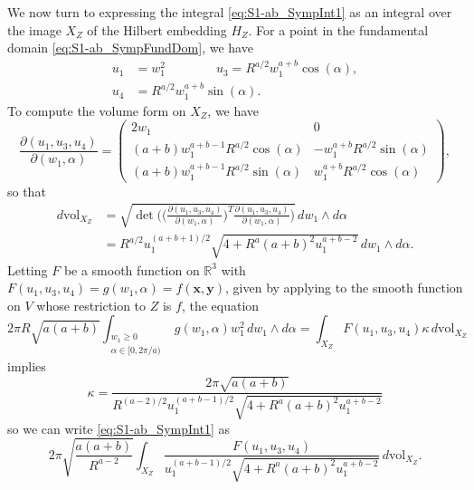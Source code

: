 \documentclass[twoside]{amsart}
\theoremstyle{definition}
\theoremstyle{remark}
\numberwithin{equation}{section}
\newcommand{\R}{\mathbb{R}}
\newcommand{\vol}{\text{vol}}
\begin{document}
We now turn to expressing the integral \eqref{eq:S1-ab_SympInt1} as an integral over the image $X_Z$ of the Hilbert embedding $H_Z$.
For a point in the fundamental domain \eqref{eq:S1-ab_SympFundDom}, we have
\begin{equation}
\label{eq:S1-ab_SympRInvarsInW}
\begin{split}
    u_1 &=      w_1^2
    \qquad\qquad
    u_3 =       R^{a/2} w_1^{a + b} \cos(\alpha),
    \\
    u_4 &=      R^{a/2} w_1^{a + b} \sin(\alpha).
\end{split}
\end{equation}
To compute the volume form on $X_Z$, we have
\[
    \frac{\partial (u_1, u_3, u_4)}{ \partial (w_1, \alpha)}
    =
    \begin{pmatrix}
        2w_1    &   0
        \\
        (a+b) w_1^{a + b - 1} R^{a/2} \cos(\alpha)
            &   - w_1^{a + b} R^{a/2} \sin(\alpha)
        \\
        (a+b) w_1^{a + b - 1} R^{a/2} \sin(\alpha)
            &   w_1^{a + b} R^{a/2} \cos(\alpha)
    \end{pmatrix},
\]
so that
\begin{align*}
    d\vol_{X_Z}
    &=      \sqrt{\det \Bigg(\Big(\frac{\partial (u_1, u_3, u_4)}{ \partial (w_1, \alpha)}\Big)^T \frac{\partial (u_1, u_3, u_4)}{ \partial (w_1, \alpha)}\Bigg)}
                \, dw_1 \wedge d\alpha
    \\&=    R^{a/2} u_1^{(a + b + 1)/2}  \sqrt{ 4 + R^a (a + b)^2 u_1^{a + b - 2} } \, dw_1 \wedge d\alpha.
\end{align*}
Letting $F$ be a smooth function on $\R^3$ with $F(u_1, u_3, u_4) = g(w_1, \alpha) = f(\mathbf{x}, \mathbf{y})$, given by applying \cite[Thrm.~1]{GWSdiff} to the
smooth function on $V$ whose restriction to $Z$ is $f$, the equation
\[
     2\pi R \sqrt{a(a + b)}  \int_{\substack{w_1 \geq 0 \\ \alpha\in[0,2\pi/a)}} g(w_1, \alpha)
        w_1^2 \, dw_1 \wedge  d\alpha
     =
     \int_{X_Z} F(u_1, u_3, u_4) \kappa \, d\vol_{X_Z}
\]
implies
\[
    \kappa
    =
    \frac{ 2\pi \sqrt{a(a + b)} }
    { R^{(a-2)/2} u_1^{(a + b - 1)/2} \sqrt{ 4 + R^a (a + b)^2 u_1^{a + b - 2} } }
\]
so we can write \eqref{eq:S1-ab_SympInt1} as
\begin{equation}
\label{eq:S1-ab_SympInt2}
    2\pi \sqrt{\frac{a(a+b)}{R^{a-2}}} \int_{X_Z}
        \frac{ F(u_1, u_3, u_4) }{ u_1^{(a + b - 1)/2} \sqrt{4 + R^a(a + b)^2 u_1^{a + b - 2} } }
    \, d\vol_{X_Z}.
\end{equation}
\end{document}
